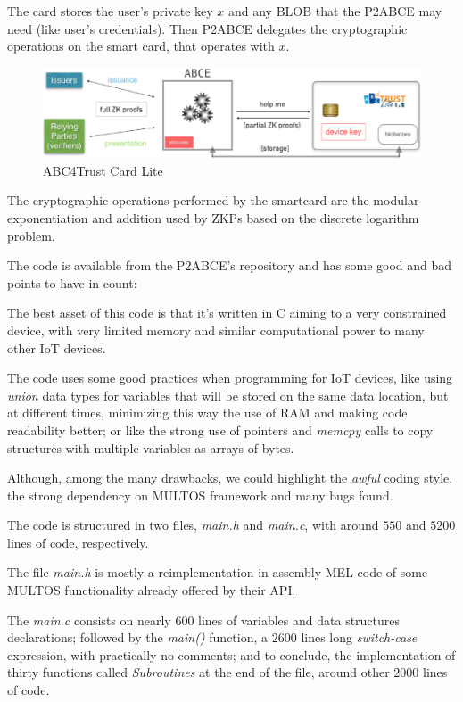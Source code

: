 The card stores the user's private key $x$ and any \ac{BLOB} that the P2ABCE may need (like user's credentials). Then P2ABCE delegates the cryptographic operations on the smart card, that operates with $x$.

\begin{figure}[bth]
	\begin{center}
		\includegraphics[width=\linewidth]{gfx/ABC4TCardLite}
	\end{center}
	\caption{ABC4Trust Card Lite}
	\label{fig:ABC4TCardLite}
\end{figure}

The cryptographic operations performed by the smartcard are the modular exponentiation and addition used by ZKPs based on the discrete logarithm problem.

\hfil

The code is available from the P2ABCE's repository and has some good and bad points to have in count:

The best asset of this code is that it's written in C aiming to a very constrained device, with very limited memory and similar computational power to many other IoT devices.

The code uses some good practices when programming for IoT devices, like using \textit{union} data types for variables that will be stored on the same data location, but at different times, minimizing this way the use of RAM and making code readability better; or like the strong use of pointers and \textit{memcpy} calls to copy structures with multiple variables as arrays of bytes.


Although, among the many drawbacks, we could highlight the \textit{awful} coding style, the strong dependency on MULTOS framework and many bugs found. 

The code is structured in two files, \textit{main.h} and \textit{main.c}, with around $550$ and $5200$ lines of code, respectively.

The file \textit{main.h} is mostly a reimplementation in assembly MEL code of some MULTOS functionality already offered by their API.

The \textit{main.c} consists on nearly $600$ lines of variables and data structures declarations; followed by the \textit{main()} function, a $2600$ lines long \textit{switch-case} expression, with practically no comments; and to conclude, the implementation of thirty functions called \textit{Subroutines} at the end of the file, around other $2000$ lines of code.

